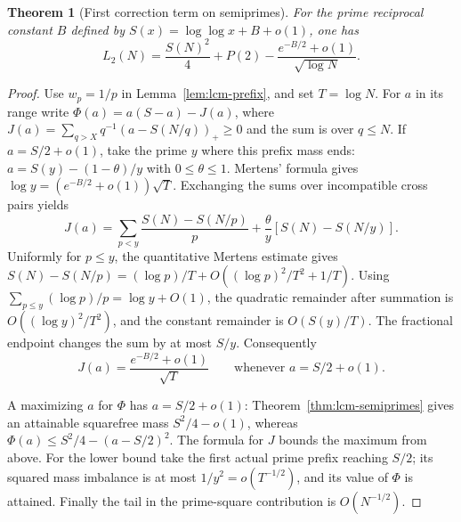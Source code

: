 \documentclass[11pt,a4paper]{article}
\newtheorem{theorem}{Theorem}[section]
\begin{document}
\begin{theorem}[First correction term on semiprimes]\label{thm:lcm-correction}
For the prime reciprocal constant $B$ defined by
$S(x)=\log\log x+B+o(1)$, one has
\[
 L_2(N)=\frac{S(N)^2}{4}+P(2)
       -\frac{e^{-B/2}+o(1)}{\sqrt{\log N}}.
\]
\end{theorem}
\begin{proof}
Use $w_p=1/p$ in Lemma~\ref{lem:lcm-prefix}, and set $T=\log N$.
For $a$ in its range write
$\Phi(a)=a(S-a)-J(a)$, where
$J(a)=\sum_{q>X}q^{-1}(a-S(N/q))_+\ge0$ and the sum is over $q\le N$.
If $a=S/2+o(1)$, take the prime $y$ where this prefix mass ends:
$a=S(y)- (1-\theta)/y$ with $0\le\theta\le1$.
Mertens' formula gives $\log y=(e^{-B/2}+o(1))\sqrt T$.
Exchanging the sums over incompatible cross pairs yields
\[
 J(a)=\sum_{p<y}\frac{S(N)-S(N/p)}p+
        \frac{\theta}{y}[S(N)-S(N/y)].
\]
Uniformly for $p\le y$, the quantitative Mertens estimate gives
$S(N)-S(N/p)=(\log p)/T+O((\log p)^2/T^2+1/T)$.
Using $\sum_{p\le y}(\log p)/p=\log y+O(1)$, the quadratic
remainder after summation is $O((\log y)^2/T^2)$, and the constant
remainder is $O(S(y)/T)$. The fractional endpoint changes the sum by
at most $S/y$. Consequently
\[
 J(a)=\frac{e^{-B/2}+o(1)}{\sqrt T}
 \qquad\text{whenever } a=S/2+o(1).
\]

A maximizing $a$ for $\Phi$ has $a=S/2+o(1)$: Theorem~\ref{thm:lcm-semiprimes}
gives an attainable squarefree mass $S^2/4-o(1)$, whereas
$\Phi(a)\le S^2/4-(a-S/2)^2$. The formula for $J$ bounds the maximum
from above. For the lower bound take the first actual prime prefix reaching
$S/2$; its squared mass imbalance is at most $1/y^2=o(T^{-1/2})$,
and its value of $\Phi$ is attained. Finally the tail in the prime-square
contribution is $O(N^{-1/2})$.
\end{proof}
\end{document}
